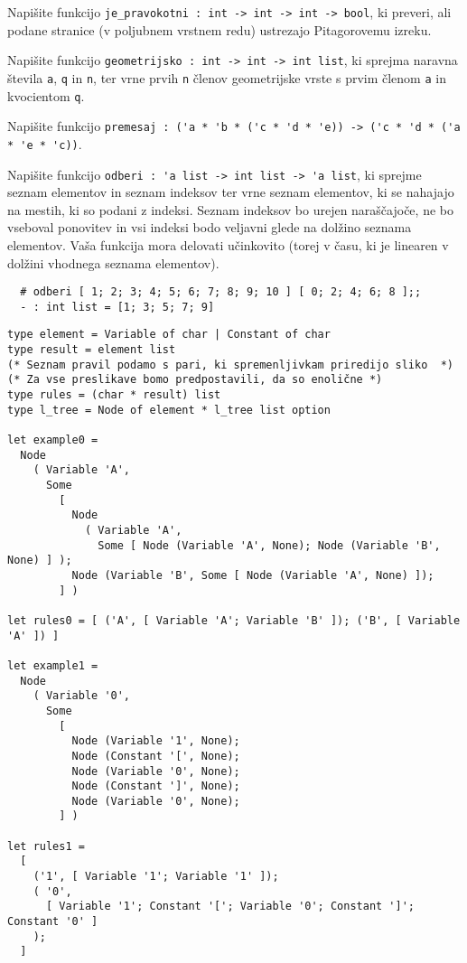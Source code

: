 \documentclass[arhiv]{../izpit}
\begin{document}


\naloga

\podnaloga
Napišite funkcijo \verb|je_pravokotni : int -> int -> int -> bool|, ki preveri, ali podane stranice (v poljubnem vrstnem redu) ustrezajo Pitagorovemu izreku.

\podnaloga
Napišite funkcijo \verb|geometrijsko : int -> int -> int list|, ki sprejma naravna števila \verb|a|, \verb|q| in \verb|n|, ter vrne prvih \verb|n| členov geometrijske vrste s prvim členom \verb|a| in kvocientom \verb|q|.

\podnaloga
Napišite funkcijo \verb|premesaj : ('a * 'b * ('c * 'd * 'e)) -> ('c * 'd * ('a * 'e * 'c))|.

\podnaloga
Napišite funkcijo \verb|odberi : 'a list -> int list -> 'a list|, ki sprejme seznam elementov in seznam indeksov ter vrne seznam elementov, ki se nahajajo na mestih, ki so podani z indeksi.
Seznam indeksov bo urejen naraščajoče, ne bo vseboval ponovitev in vsi indeksi bodo veljavni glede na dolžino seznama elementov.
Vaša funkcija mora delovati učinkovito (torej v času, ki je linearen v dolžini vhodnega seznama elementov).

\begin{verbatim}
  # odberi [ 1; 2; 3; 4; 5; 6; 7; 8; 9; 10 ] [ 0; 2; 4; 6; 8 ];;
  - : int list = [1; 3; 5; 7; 9]
\end{verbatim}



\naloga

\begin{verbatim}
type element = Variable of char | Constant of char
type result = element list
(* Seznam pravil podamo s pari, ki spremenljivkam priredijo sliko  *)
(* Za vse preslikave bomo predpostavili, da so enolične *)
type rules = (char * result) list
type l_tree = Node of element * l_tree list option

let example0 =
  Node
    ( Variable 'A',
      Some
        [
          Node
            ( Variable 'A',
              Some [ Node (Variable 'A', None); Node (Variable 'B', None) ] );
          Node (Variable 'B', Some [ Node (Variable 'A', None) ]);
        ] )

let rules0 = [ ('A', [ Variable 'A'; Variable 'B' ]); ('B', [ Variable 'A' ]) ]

let example1 =
  Node
    ( Variable '0',
      Some
        [
          Node (Variable '1', None);
          Node (Constant '[', None);
          Node (Variable '0', None);
          Node (Constant ']', None);
          Node (Variable '0', None);
        ] )

let rules1 =
  [
    ('1', [ Variable '1'; Variable '1' ]);
    ( '0',
      [ Variable '1'; Constant '['; Variable '0'; Constant ']'; Constant '0' ]
    );
  ]
\end{verbatim}
\end{document}
